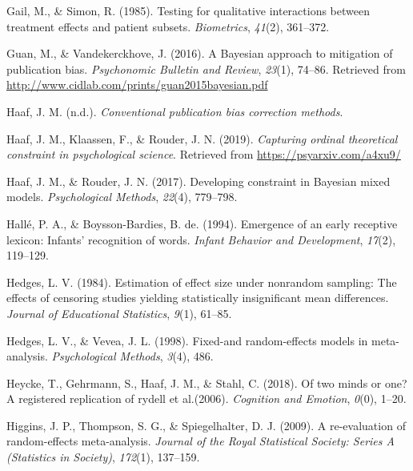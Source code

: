 \documentclass[english,,man]{apa6}
\begin{document}
\leavevmode\hypertarget{ref-Gail:Simon:1985}{}%
Gail, M., \& Simon, R. (1985). Testing for qualitative interactions between treatment effects and patient subsets. \emph{Biometrics}, \emph{41}(2), 361--372.

\leavevmode\hypertarget{ref-Guan:Vandekerckhove:2016}{}%
Guan, M., \& Vandekerckhove, J. (2016). A Bayesian approach to mitigation of publication bias. \emph{Psychonomic Bulletin and Review}, \emph{23}(1), 74--86. Retrieved from \url{http://www.cidlab.com/prints/guan2015bayesian.pdf}

\leavevmode\hypertarget{ref-Haaf:2020}{}%
Haaf, J. M. (n.d.). \emph{Conventional publication bias correction methods}.

\leavevmode\hypertarget{ref-Haaf:etal:2019}{}%
Haaf, J. M., Klaassen, F., \& Rouder, J. N. (2019). \emph{Capturing ordinal theoretical constraint in psychological science}. Retrieved from \url{https://psyarxiv.com/a4xu9/}

\leavevmode\hypertarget{ref-Haaf:Rouder:2017}{}%
Haaf, J. M., \& Rouder, J. N. (2017). Developing constraint in Bayesian mixed models. \emph{Psychological Methods}, \emph{22}(4), 779--798.

\leavevmode\hypertarget{ref-Halle:Boysson:1994}{}%
Hallé, P. A., \& Boysson-Bardies, B. de. (1994). Emergence of an early receptive lexicon: Infants' recognition of words. \emph{Infant Behavior and Development}, \emph{17}(2), 119--129.

\leavevmode\hypertarget{ref-Hedges:1984}{}%
Hedges, L. V. (1984). Estimation of effect size under nonrandom sampling: The effects of censoring studies yielding statistically insignificant mean differences. \emph{Journal of Educational Statistics}, \emph{9}(1), 61--85.

\leavevmode\hypertarget{ref-Hedges:Vevea:1998}{}%
Hedges, L. V., \& Vevea, J. L. (1998). Fixed-and random-effects models in meta-analysis. \emph{Psychological Methods}, \emph{3}(4), 486.

\leavevmode\hypertarget{ref-Heycke:etal:2018}{}%
Heycke, T., Gehrmann, S., Haaf, J. M., \& Stahl, C. (2018). Of two minds or one? A registered replication of rydell et al.(2006). \emph{Cognition and Emotion}, \emph{0}(0), 1--20.

\leavevmode\hypertarget{ref-Higgins:etal:2009}{}%
Higgins, J. P., Thompson, S. G., \& Spiegelhalter, D. J. (2009). A re-evaluation of random-effects meta-analysis. \emph{Journal of the Royal Statistical Society: Series A (Statistics in Society)}, \emph{172}(1), 137--159.
\end{document}
